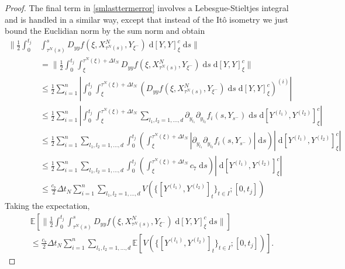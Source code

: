 \documentclass[reqno,12pt]{amsart}
\theoremstyle{plain} %
\theoremstyle{definition} %
\begin{document}
\begin{proof}
    The final term in \cref{smlasttermerror} involves a Lebesgue-Stieltjes integral and is handled in a similar way, except that instead of the It\^o isometry we just bound the Euclidian norm by the sum norm and obtain
    \begin{align*}
        \bigg\|\frac{1}{2} \int_0^{t_j} & \int_{\tau^N(s)}^s D_{yy}f(\xi, X_{\tau^N(s)}^N, Y_{\xi^-})\;\mathrm{d}[Y, Y]_\xi^c\;\mathrm{d}s \bigg\| \\
        & = \bigg\|\frac{1}{2} \int_0^{t_j} \int_{\xi}^{\tau^N(\xi) + \Delta t_N} D_{yy}f(\xi, X_{\tau^N(s)}^N, Y_{\xi^-})\;\mathrm{d}s \;\mathrm{d}[Y, Y]_\xi^c \bigg\| \\
        & \leq \frac{1}{2} \sum_{i=1}^n \left|\int_0^{t_j} \int_{\xi}^{\tau^N(\xi) + \Delta t_N} \left(D_{yy}f(\xi, X_{\tau^N(s)}^N, Y_{\xi^-})\;\mathrm{d}s \;\mathrm{d}[Y, Y]_\xi^c\right)^{(i)}\right| \\
        & \leq \frac{1}{2} \sum_{i=1}^n \left|\int_0^{t_j} \int_{\xi}^{\tau^N(\xi) + \Delta t_N} \sum_{l_1, l_2 = 1, \ldots, d} \partial_{y_{l_1}}\partial_{y_{l_2}} f_i(s, Y_{s^-})\;\mathrm{d}s\;\mathrm{d}[Y^{(l_1)}, Y^{(l_2)}]_\xi^c\right| \\
        & \leq \frac{1}{2} \sum_{i=1}^n \sum_{l_1, l_2 = 1, \ldots, d} \int_0^{t_j} \left(\int_{\xi}^{\tau^N(\xi) + \Delta t_N} \left|\partial_{y_{l_1}}\partial_{y_{l_2}} f_i(s, Y_{s^-})\right|\;\mathrm{d}s\right) \left|\;\mathrm{d}[Y^{(l_1)}, Y^{(l_2)}]_\xi^c\right| \\
        & \leq \frac{1}{2} \sum_{i=1}^n \sum_{l_1, l_2 = 1, \ldots, d} \int_0^{t_j} \left(\int_{\xi}^{\tau^N(\xi) + \Delta t_N} c_7 \;\mathrm{d}s\right)\left|\;\mathrm{d}[Y^{(l_1)}, Y^{(l_2)}]_\xi^c\right| \\
        & \leq \frac{c_7}{2}\Delta t_N \sum_{i=1}^n \sum_{l_1, l_2 = 1, \ldots, d} V(\{[Y^{(l_1)}, Y^{(l_2)}]_t\}_{t\in I}; [0, t_j])
    \end{align*}
    Taking the expectation,
    \begin{multline}
        \label{strongorderterm4}
        \mathbb{E}\left[\bigg\|\frac{1}{2} \int_0^{t_j} \int_{\tau^N(s)}^s D_{yy}f(\xi, X_{\tau^N(s)}^N, Y_{\xi^-})\;\mathrm{d}[Y, Y]_\xi^c\;\mathrm{d}s \bigg\|\right] \\
        \leq \frac{c_7}{2}\Delta t_N \sum_{i=1}^n \sum_{l_1, l_2 = 1, \ldots, d}\mathbb{E}\left[V(\{[Y^{(l_1)}, Y^{(l_2)}]_t\}_{t\in I}; [0, t_j])\right].
    \end{multline}


\end{proof}
\end{document}

